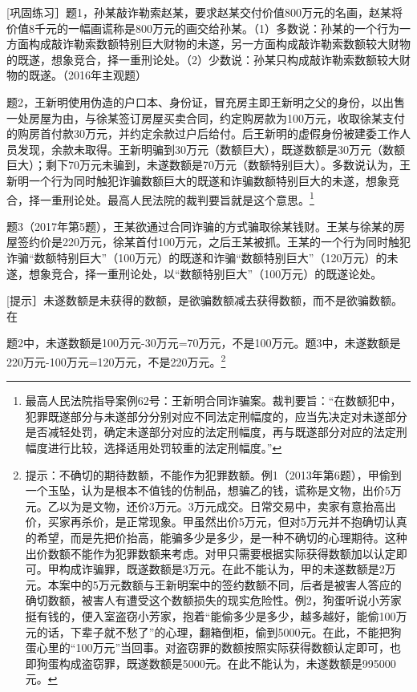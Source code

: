 
[巩固练习］题1，孙某敲诈勒索赵某，要求赵某交付价值800万元的名画，赵某将价值8千元的一幅画谎称是800万元的画交给孙某。（1）多数说：孙某的一个行为一方面构成敲诈勒索数额特别巨大财物的未遂，另一方面构成敲诈勒索数额较大财物的既遂，想象竞合，择一重刑论处。（2）少数说：孙某只构成敲诈勒索数额较大财物的既遂。（2016年主观题）

题2，王新明使用伪造的户口本、身份证，冒充房主即王新明之父的身份，以出售一处房屋为由，与徐某签订房屋买卖合同，约定购房款为100万元，收取徐某支付的购房首付款30万元，并约定余款过户后给付。后王新明的虚假身份被建委工作人员发现，余款未取得。王新明骗到30万元（数额巨大），既遂数额是30万元（数额巨大）；剩下70万元未骗到，未遂数额是70万元（数额特别巨大）。多数说认为，王新明一个行为同时触犯诈骗数额巨大的既遂和诈骗数额特别巨大的未遂，想象竞合，择一重刑论处。最高人民法院的裁判要旨就是这个意思。\footnote{最高人民法院指导案例62号：王新明合同诈骗案。裁判要旨：“在数额犯中，犯罪既遂部分与未遂部分分别对应不同法定刑幅度的，应当先决定对未遂部分是否减轻处罚，确定未遂部分对应的法定刑幅度，再与既遂部分对应的法定刑幅度进行比较，选择适用处罚较重的法定刑幅度。”}

题3（2017年第5题），王某欲通过合同诈骗的方式骗取徐某钱财。王某与徐某的房屋签约价是220万元，徐某首付100万元，之后王某被抓。王某的一个行为同时触犯诈骗“数额特别巨大”（100万元）的既遂和诈骗“数额特别巨大”（120万元）的未遂，想象竞合，择一重刑论处，以“数额特别巨大”（100万元）的既遂论处。

[提示］未遂数额是未获得的数额，是欲骗数额减去获得数额，而不是欲骗数额。在

题2中，未遂数额是100万元-30万元=70万元，不是100万元。题3中，未遂数额是220万元-100万元=120万元，不是220万元。\footnote{提示：不确切的期待数额，不能作为犯罪数额。例1（2013年第6题），甲偷到一个玉坠，认为是根本不值钱的仿制品，想骗乙的钱，谎称是文物，出价5万元。乙以为是文物，还价3万元。3万元成交。日常交易中，卖家有意抬高出价，买家再杀价，是正常现象。甲虽然出价5万元，但对5万元并不抱确切认真的希望，而是先把价抬高，能骗多少是多少，是一种不确切的心理期待。这种出价数额不能作为犯罪数额来考虑。对甲只需要根据实际获得数额加以认定即可。甲构成诈骗罪，既遂数额是3万元。在此不能认为，甲的未遂数额是2万元。本案中的5万元数额与王新明案中的签约数额不同，后者是被害人答应的确切数额，被害人有遭受这个数额损失的现实危险性。例2，狗蛋听说小芳家挺有钱的，便入室盗窃小芳家，抱着“能偷多少是多少，越多越好，能偷100万元的话，下辈子就不愁了”的心理，翻箱倒柜，偷到5000元。在此，不能把狗蛋心里的“100万元”当回事。对盗窃罪的数额按照实际获得数额认定即可，也即狗蛋构成盗窃罪，既遂数额是5000元。在此不能认为，未遂数额是995000元。}

